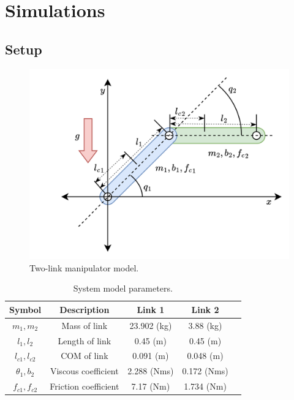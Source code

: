 \documentclass[letterpaper, 10 pt, conference]{ieeeconf}  %
\begin{document}

\section{Simulations}\label{sec:sim}

\subsection{Setup}

\begin{figure}[!t]
    \centering
    \includegraphics[width=0.8\linewidth]{fig/RobotModel.drawio.png}
    \caption{Two-link manipulator model.}
    \label{fig: manipulator}
\end{figure}

\begin{table}[!t]
    \renewcommand{\arraystretch}{1.3}
    \caption{System model parameters.}
    \centering
    \begin{tabular}{|c||c|c|c|c|}
    \hline
    Symbol & \textbf{Description} & \textbf{Link 1} & \textbf{Link 2} \\
    \hline 
    $m_1, m_2$ & Mass of link    & 23.902 (kg) & 3.88 (kg) \\
    \hline
    $l_1, l_2$  & Length of link   & 0.45 (m) & 0.45 (m) \\
    \hline
    $l_{c1}, l_{c2}$ & COM of link  & 0.091 (m) & 0.048 (m) \\
    \hline
    $\theta_1, b_2$   & Viscous coefficient  &  2.288 (Nms) & 0.172 (Nms) \\
    \hline
    $f_{c1}, f_{c2}$  & Friction coefficient &  7.17 (Nm) & 1.734 (Nm) \\
    \hline
    \end{tabular}
    \label{table: system parameters}
\end{table}
\end{document}
